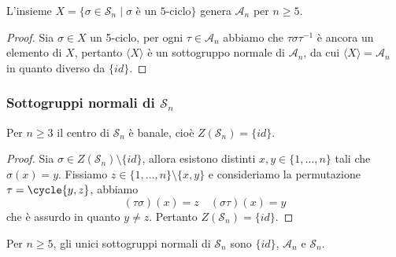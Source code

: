 \documentclass[11pt]{scrartcl}
\begin{document}
	\begin{corollary}
		L'insieme $X = \{\sigma \in \mathcal{S}_n\mid \sigma \text{ è un 5-ciclo}\}$ genera
		$\mathcal{A}_n$ per $n \geqslant 5$.
	\end{corollary}
	
	\begin{proof}
		Sia $\sigma \in X$ un 5-ciclo, per ogni $\tau \in \mathcal{A}_n$
		abbiamo che $\tau\sigma\tau^{-1}$ è ancora un elemento di $X$, pertanto
		$\langle X\rangle$ è un sottogruppo normale di $\mathcal{A}_n$, da cui 
		$\langle X \rangle = \mathcal{A}_n$ in quanto diverso da $\{id\}$.
	\end{proof}
	
	
	\subsubsection{Sottogruppi normali di $\mathcal{S}_n$}
	
	\begin{lemma}
		\label{lemma1.65}
		Per $n \geq 3$ il centro di $\mathcal{S}_n$ è banale, cioè $Z(\mathcal{S}_n) = \{id\}$.
	\end{lemma}
	
	\begin{proof}
		Sia $\sigma \in Z(\mathcal{S}_n) \setminus \{id\}$, allora esistono distinti 
		$x, y \in \{1, \ldots, n\}$ tali che $\sigma(x) = y$. Fissiamo 
		$z \in \{1, \ldots, n\}\setminus \{x, y\}$ e consideriamo la permutazione
		$\tau = \cycle{y, z}$, abbiamo
		\[
		(\tau\sigma)(x) = z \quad (\sigma\tau)(x) = y
		\]
		che è assurdo in quanto $y \neq z$. Pertanto $Z(\mathcal{S}_n) = \{id\}$.
	\end{proof}
	
	\begin{proposition}
		Per $n\geq 5$, gli unici sottogruppi normali di $\mathcal{S}_n$ sono $\{id\}$,
		$\mathcal{A}_n$ e $\mathcal{S}_n$.
	\end{proposition}
	
\end{document}
